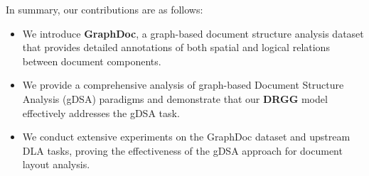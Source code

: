 In summary, our contributions are as follows:

\begin{itemize} 
    \item We introduce \textbf{GraphDoc}, a graph-based document structure analysis dataset that provides detailed annotations of both spatial and logical relations between document components. 
    \item We provide a comprehensive analysis of graph-based Document Structure Analysis (gDSA) paradigms and demonstrate that our \textbf{DRGG} model effectively addresses the gDSA task.
    \item We conduct extensive experiments on the GraphDoc dataset and upstream DLA tasks, proving the effectiveness of the gDSA approach for document layout analysis. 
\end{itemize}




